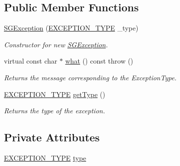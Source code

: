 \subsection*{Public Member Functions}
\begin{DoxyCompactItemize}
\item 
\hypertarget{classSGException_a5b8775f80242f3a73b2a3b3d3a298131}{\hyperlink{classSGException_a5b8775f80242f3a73b2a3b3d3a298131}{S\-G\-Exception} (\hyperlink{classSGException_af5054226bbd734c10b3a2e6d0505a984}{E\-X\-C\-E\-P\-T\-I\-O\-N\-\_\-\-T\-Y\-P\-E} \-\_\-type)}\label{classSGException_a5b8775f80242f3a73b2a3b3d3a298131}

\begin{DoxyCompactList}\small\item\em Constructor for new \hyperlink{classSGException}{S\-G\-Exception}. \end{DoxyCompactList}\item 
\hypertarget{classSGException_ae95735eb15a25063aa713cd9d3c1ec7a}{virtual const char $\ast$ \hyperlink{classSGException_ae95735eb15a25063aa713cd9d3c1ec7a}{what} () const   throw ()}\label{classSGException_ae95735eb15a25063aa713cd9d3c1ec7a}

\begin{DoxyCompactList}\small\item\em Returns the message corresponding to the Exception\-Type. \end{DoxyCompactList}\item 
\hypertarget{classSGException_a3e2cf202a68e0dc44947525e4a70a0b7}{\hyperlink{classSGException_af5054226bbd734c10b3a2e6d0505a984}{E\-X\-C\-E\-P\-T\-I\-O\-N\-\_\-\-T\-Y\-P\-E} \hyperlink{classSGException_a3e2cf202a68e0dc44947525e4a70a0b7}{get\-Type} ()}\label{classSGException_a3e2cf202a68e0dc44947525e4a70a0b7}

\begin{DoxyCompactList}\small\item\em Returns the type of the exception. \end{DoxyCompactList}\end{DoxyCompactItemize}
\subsection*{Private Attributes}
\begin{DoxyCompactItemize}
\item 
\hyperlink{classSGException_af5054226bbd734c10b3a2e6d0505a984}{E\-X\-C\-E\-P\-T\-I\-O\-N\-\_\-\-T\-Y\-P\-E} \hyperlink{classSGException_af42ea45b5685850a040ac58d4631afa4}{type}
\end{DoxyCompactItemize}


